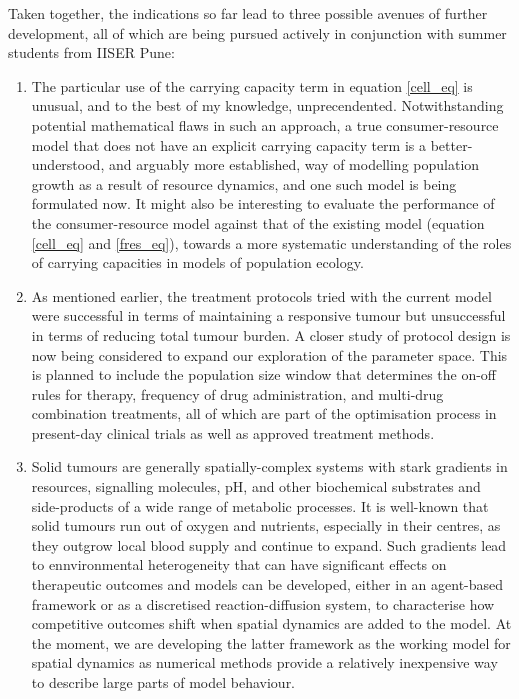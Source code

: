 \documentclass[12pt,onecolumn,twoside]{article}
\begin{document}
	Taken together, the indications so far lead to three possible avenues of further development, all of which are being pursued actively in conjunction with summer students from IISER Pune:
	\begin{enumerate}
		\item The particular use of the carrying capacity term in equation \ref{cell_eq} is unusual, and to the best of my knowledge, unprecendented. Notwithstanding potential mathematical flaws in such an approach, a true consumer-resource model that does not have an explicit carrying capacity term is a better-understood, and arguably more established, way of modelling population growth as a result of resource dynamics, and one such model is being formulated now. It might also be interesting to evaluate the performance of the consumer-resource model against that of the existing model (equation \ref{cell_eq} and \ref{fres_eq}), towards a more systematic understanding of the roles of carrying capacities in models of population ecology.
		\item As mentioned earlier, the treatment protocols tried with the current model were successful in terms of maintaining a responsive tumour but unsuccessful in terms of reducing total tumour burden. A closer study of protocol design is now being considered to expand our exploration of the parameter space. This is planned to include the population size window that determines the on-off rules for therapy, frequency of drug administration, and multi-drug combination treatments, all of which are part of the optimisation process in present-day clinical trials as well as approved treatment methods.
		\item Solid tumours are generally spatially-complex systems with stark gradients in resources, signalling molecules, pH, and other biochemical substrates and side-products of a wide range of metabolic processes. It is well-known that solid tumours run out of oxygen and nutrients, especially in their centres, as they outgrow local blood supply and continue to expand. Such gradients lead to ennvironmental heterogeneity that can have significant effects on therapeutic outcomes and models can be developed, either in an agent-based framework or as a discretised reaction-diffusion system, to characterise how competitive outcomes shift when spatial dynamics are added to the model. At the moment, we are developing the latter framework as the working model for spatial dynamics as numerical methods provide a relatively inexpensive way to describe large parts of model behaviour.
	\end{enumerate}
\end{document}
